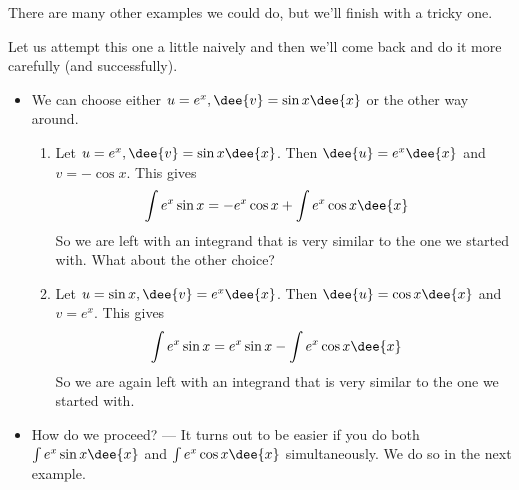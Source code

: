 There are many other examples we could do, but we'll finish with a tricky one.
\begin{eg}\label{eg:circularint}
\soln Let us attempt this one a little naively and then we'll come back and do
it more carefully (and successfully).
\begin{itemize}
 \item We can choose either $u=e^x, \dee{v}=\sin x\dee{x}$ or the other way
around.
\begin{enumerate}
 \item Let $u=e^x, \dee{v}=\sin x\dee{x}$. Then $\dee{u}=e^x\dee{x}$ and
$v=-\cos x$. This gives
\begin{align*}
  \int e^x \sin x &= -e^x\cos x + \int e^x \cos x \dee{x}
\end{align*}
So we are left with an integrand that is very similar to the one
we started with. What about the other choice?

 \item Let $u=\sin x, \dee{v}=e^x\dee{x}$. Then $\dee{u}=\cos x\dee{x}$ and
$v= e^x$. This gives
\begin{align*}
  \int e^x \sin x &= e^x\sin x - \int e^x \cos x \dee{x}
\end{align*}
So we are again left with an integrand that is very similar to the one
we started with.
\end{enumerate}
\item How do we proceed? --- It turns out to be easier if you do both $\int
e^x\sin x\dee{x}$ and $\int e^x \cos x\dee{x}$ simultaneously. We do so in the
next example.
\end{itemize}
\end{eg}

